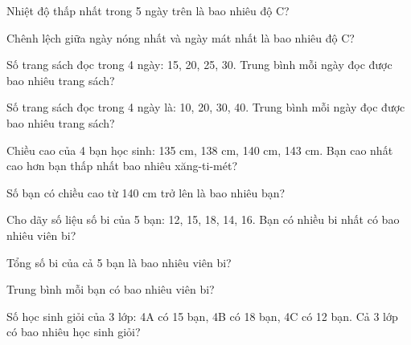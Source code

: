 \begin{ex}
Nhiệt độ thấp nhất trong 5 ngày trên là bao nhiêu độ C?
\end{ex}

\begin{ex}
Chênh lệch giữa ngày nóng nhất và ngày mát nhất là bao nhiêu độ C?
\end{ex}

\begin{ex}
Số trang sách đọc trong 4 ngày: 15, 20, 25, 30. Trung bình mỗi ngày đọc được bao nhiêu trang sách?
\end{ex}

\begin{ex}
Số trang sách đọc trong 4 ngày là: 10, 20, 30, 40. Trung bình mỗi ngày đọc được bao nhiêu trang sách?
\end{ex}

\begin{ex}
Chiều cao của 4 bạn học sinh: 135 cm, 138 cm, 140 cm, 143 cm. Bạn cao nhất cao hơn bạn thấp nhất bao nhiêu xăng-ti-mét?
\end{ex}

\begin{ex}
Số bạn có chiều cao từ 140 cm trở lên là bao nhiêu bạn?
\end{ex}

\begin{ex}
Cho dãy số liệu số bi của 5 bạn: 12, 15, 18, 14, 16. Bạn có nhiều bi nhất có bao nhiêu viên bi?
\end{ex}

\begin{ex}
Tổng số bi của cả 5 bạn là bao nhiêu viên bi?
\end{ex}

\begin{ex}
Trung bình mỗi bạn có bao nhiêu viên bi?
\end{ex}

\begin{ex}
Số học sinh giỏi của 3 lớp: 4A có 15 bạn, 4B có 18 bạn, 4C có 12 bạn. Cả 3 lớp có bao nhiêu học sinh giỏi?
\end{ex}

